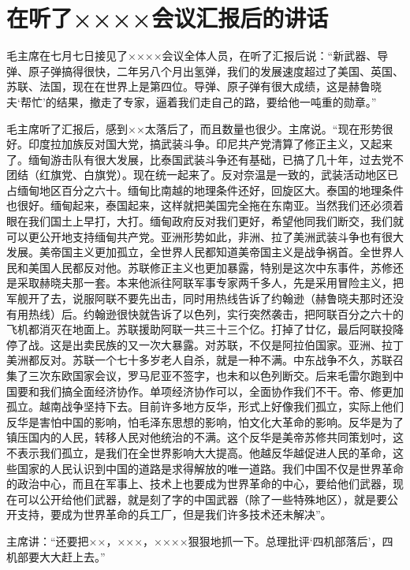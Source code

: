 \section[在听了××××会议汇报后的讲话（一九六七年七月七日）]{在听了××××会议汇报后的讲话}


毛主席在七月七日接见了××××会议全体人员，在听了汇报后说：“新武器、导弹、原子弹搞得很快，二年另八个月出氢弹，我们的发展速度超过了美国、英国、苏联、法国，现在在世界上是第四位。导弹、原子弹有很大成绩，这是赫鲁晓夫‘帮忙’的结果，撤走了专家，逼着我们走自己的路，要给他一吨重的勋章。”

毛主席听了汇报后，感到××太落后了，而且数量也很少。主席说。“现在形势很好。印度拉加族反对国大党，搞武装斗争。印尼共产党清算了修正主义，又起来了。缅甸游击队有很大发展，比泰国武装斗争还有基础，已搞了几十年，过去党不团结（红旗党、白旗党）。现在统一起来了。反对奈温是一致的，武装活动地区已占缅甸地区百分之六十。缅甸比南越的地理条件还好，回旋区大。泰国的地理条件也很好。缅甸起来，泰国起来，这样就把美国完全拖在东南亚。当然我们还必须着眼在我们国土上早打，大打。缅甸政府反对我们更好，希望他同我们断交，我们就可以更公开地支持缅甸共产党。亚洲形势如此，非洲、拉了美洲武装斗争也有很大发展。美帝国主义更加孤立，全世界人民都知道美帝国主义是战争祸首。全世界人民和美国人民都反对他。苏联修正主义也更加暴露，特别是这次中东事件，苏修还是采取赫晓夫那一套。本来他派往阿联军事专家两千多人，先是采用冒险主义，把军舰开了去，说服阿联不要先出击，同时用热线告诉了约翰逊（赫鲁晓夫那时还没有用热线）后。约翰逊很快就告诉了以色列，实行突然袭击，把阿联百分之六十的飞机都消灭在地面上。苏联援助阿联一共三十三个亿。打掉了廿亿，最后阿联投降停了战。这是出卖民族的又一次大暴露。对苏联，不仅是阿拉伯国家。亚洲、拉丁美洲都反对。苏联一个七十多岁老人自杀，就是一种不满。中东战争不久，苏联召集了三次东欧国家会议，罗马尼亚不签字，也未和以色列断交。后来毛雷尔跑到中国要和我们搞全面经济协作。单项经济协作可以，全面协作我们不干。帝、修更加孤立。越南战争坚持下去。目前许多地方反华，形式上好像我们孤立，实际上他们反华是害怕中国的影响，怕毛泽东思想的影响，怕文化大革命的影响。反华是为了镇压国内的人民，转移人民对他统治的不满。这个反华是美帝苏修共同策划吋，这不表示我们孤立，是我们在全世界影响大大提高。他越反华越促进人民的革命，这些国家的人民认识到中国的道路是求得解放的唯一道路。我们中国不仅是世界革命的政治中心，而且在军事上、技术上也要成为世界革命的中心，要给他们武器，现在可以公开给他们武器，就是刻了字的中国武器（除了一些特殊地区），就是要公开支持，要成为世界革命的兵工厂，但是我们许多技术还未解决”。

主席讲：“还要把××，×××，××××狠狠地抓一下。总理批评‘四机部落后’，四机部要大大赶上去。”



